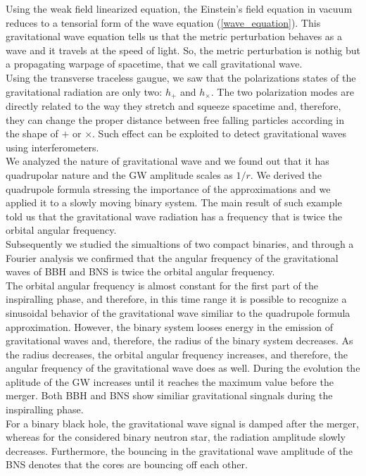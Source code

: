 Using the weak field linearized equation, the Einstein's field equation in vacuum reduces to a tensorial form of the wave equation (\ref{wave_equation}).
This gravitational wave equation tells us that the metric perturbation behaves as a wave and it travels at the speed of light.
So, the metric perturbation is nothig but a propagating warpage of spacetime, that we call gravitational wave.\\
Using the transverse traceless gaugue, we saw that the polarizations states of the gravitational radiation are only two: $h_{+}$ and $h_{\times}$.
The two polarization modes are directly related to the way they stretch and squeeze spacetime and, therefore, they can change the proper distance between free falling particles according in the shape of $+$ or $\times$.
Such effect can be exploited to detect gravitational waves using interferometers.\\
We analyzed the nature of gravitational wave  and we found out that it has quadrupolar nature and the GW amplitude scales as $1/r$.
We derived the quadrupole formula stressing the importance of the approximations and we applied it to a slowly moving binary system.
The main result of such example told us that the gravitational wave radiation has a frequency that is twice the orbital angular frequency.\\
Subsequently we studied the simualtions of two compact binaries, and through a Fourier analysis we confirmed that the angular frequency of the gravitational waves of BBH and BNS is twice the orbital angular frequency.\\
The orbital angular frequency is almost constant for the first part of the inspiralling phase, and therefore, in this time range it is possible to recognize a sinusoidal behavior of the gravitational wave similiar to the quadrupole formula approximation.
However, the binary system looses energy in the emission of gravitational waves and, therefore, the radius of the binary system decreases. 
As the radius decreases, the orbital angular frequency increases, and therefore, the angular frequency of the gravitational wave does as well. 
During the evolution the aplitude of the GW increases until it reaches the maximum value before the merger.
Both BBH and BNS show similiar gravitational singnals during the inspiralling phase.\\
For a binary black hole, the gravitational wave signal is damped after the merger, whereas for the considered binary neutron star, the radiation amplitude slowly decreases.
Furthermore, the bouncing in the gravitational wave amplitude of the BNS denotes that the cores are bouncing off each other.\\
